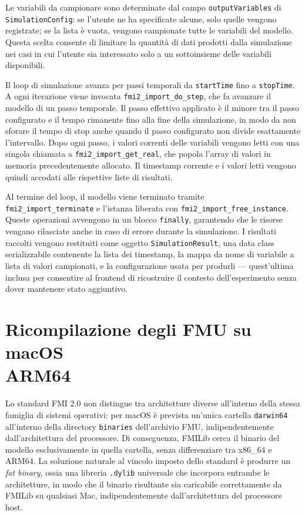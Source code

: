 Le variabili da campionare sono determinate dal campo \texttt{outputVariables} di \texttt{SimulationConfig}: se l'utente ne ha specificate alcune, solo quelle vengono registrate; se la lista è vuota, vengono campionate tutte le variabili del modello. Questa scelta consente di limitare la quantità di dati prodotti dalla simulazione nei casi in cui l'utente sia interessato solo a un sottoinsieme delle variabili disponibili.

Il loop di simulazione avanza per passi temporali da \texttt{startTime} fino a \texttt{stopTime}. A ogni iterazione viene invocata \texttt{fmi2\_import\_do\_step}, che fa avanzare il modello di un passo temporale. Il passo effettivo applicato è il minore tra il passo configurato e il tempo rimanente fino alla fine della simulazione, in modo da non sforare il tempo di stop anche quando il passo configurato non divide esattamente l'intervallo. Dopo ogni passo, i valori correnti delle variabili vengono letti con una singola chiamata a \texttt{fmi2\_import\_get\_real}, che popola l'array di valori in memoria precedentemente allocato. Il timestamp corrente e i valori letti vengono quindi accodati alle rispettive liste di risultati.

Al termine del loop, il modello viene terminato tramite \\\texttt{fmi2\_import\_terminate} e l'istanza liberata con \texttt{fmi2\_import\_free\_instance}. \\Queste operazioni avvengono in un blocco \texttt{finally}, garantendo che le risorse vengano rilasciate anche in caso di errore durante la simulazione. I risultati raccolti vengono restituiti come oggetto \texttt{SimulationResult}, una data class serializzabile contenente la lista dei timestamp, la mappa da nome di variabile a lista di valori campionati, e la configurazione usata per produrli — quest'ultima inclusa per consentire al frontend di ricostruire il contesto dell'esperimento senza dover mantenere stato aggiuntivo.

\section{Ricompilazione degli FMU su macOS\\ARM64}
\label{sec:impl-macos}

Lo standard FMI 2.0 non distingue tra architetture diverse all'interno della stessa famiglia di sistemi operativi: per macOS è prevista un'unica cartella \texttt{darwin64} all'interno della directory \texttt{binaries} dell'archivio FMU, indipendentemente\\dall'architettura del processore. Di conseguenza, FMILib cerca il binario del modello esclusivamente in quella cartella, senza differenziare tra x86\_64 e ARM64. La soluzione naturale al vincolo imposto dello standard è produrre un \emph{fat binary}, ossia una libreria \texttt{.dylib} universale che incorpora entrambe le architetture, in modo che il binario risultante sia caricabile correttamente da FMILib su qualsiasi Mac, indipendentemente dall'architettura del processore host.

